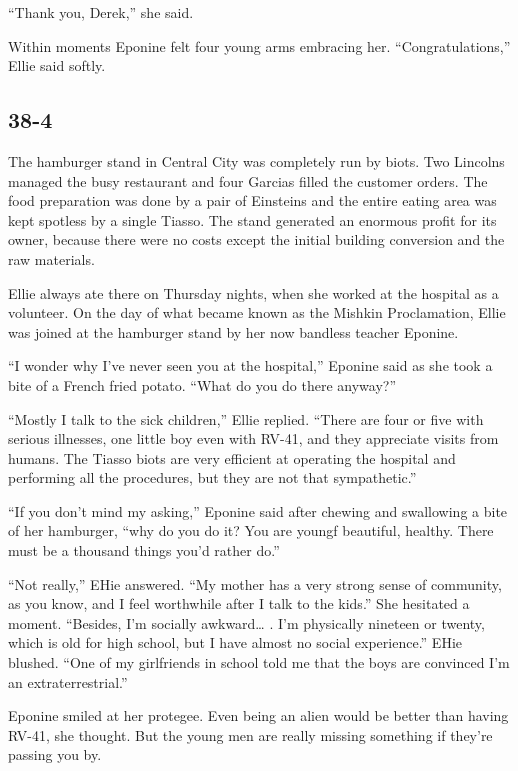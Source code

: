 \documentclass[]{article}
\begin{document}
{“Thank you, Derek,” she said.

Within moments Eponine felt four young arms embracing her. “Congratulations,” Ellie said softly.



\subsection{38-4}

The hamburger stand in Central City was completely run by biots. Two Lincolns managed the busy restaurant and four Garcias filled the customer orders. The food preparation was done by a pair of Einsteins and the entire eating area was kept spotless by a single Tiasso. The stand generated an enormous profit for its owner, because there were no costs except the initial building conversion and the raw materials.

Ellie always ate there on Thursday nights, when she worked at the hospital as a volunteer. On the day of what became known as the Mishkin Proclamation, Ellie was joined at the hamburger stand by her now bandless teacher Eponine.

“I wonder why I’ve never seen you at the hospital,” Eponine said as she took a bite of a French fried potato. “What do you do there anyway?”

“Mostly I talk to the sick children,” Ellie replied. “There are four or five with serious illnesses, one little boy even with RV-41, and they appreciate visits from humans. The Tiasso biots are very efficient at operating the hospital and performing all the procedures, but they are not that sympathetic.”

“If you don’t mind my asking,” Eponine said after chewing and swallowing a bite of her hamburger, “why do you do it? You are youngf beautiful, healthy. There must be a thousand things you’d rather do.”

“Not really,” EHie answered. “My mother has a very strong sense of community, as you know, and I feel worthwhile after I talk to the kids.” She hesitated a moment. “Besides, I’m socially awkward… . I’m physically nineteen or twenty, which is old for high school, but I have almost no social experience.” EHie blushed. “One of my girlfriends in school told me that the boys are convinced I’m an extraterrestrial.”

Eponine smiled at her protegee. Even being an alien would be better than having RV-41, she thought. But the young men are really missing something if they’re passing you by.

}
\end{document}
